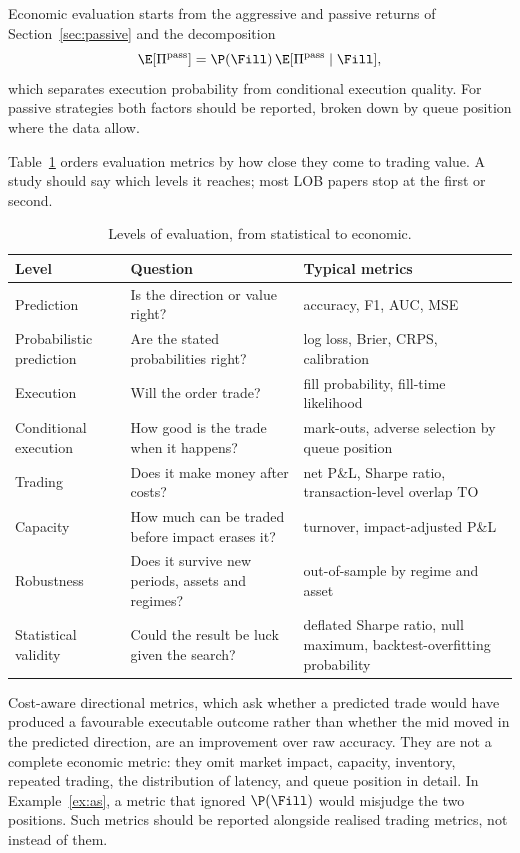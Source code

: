 Economic evaluation starts from the aggressive and passive returns of Section~\ref{sec:passive} and
the decomposition 
\[
  \E[\Pi^{\text{pass}}] = \P(\Fill)\,\E[\Pi^{\text{pass}} \mid \Fill],
\]
which separates execution probability
from conditional execution quality. For passive strategies both factors should be reported, broken
down by queue position where the data allow.

Table~\ref{tab:metric-levels} orders evaluation metrics by how close they come to trading value. A
study should say which levels it reaches; most LOB papers stop at the first or second.

\begin{table}[!htbp]
\centering\footnotesize
\caption{Levels of evaluation, from statistical to economic.}
\label{tab:metric-levels}
\begin{tabularx}{\linewidth}{l>{\raggedright\arraybackslash}X>{\raggedright\arraybackslash}X}
\toprule
Level & Question & Typical metrics \\
\midrule
Prediction & Is the direction or value right? & accuracy, F1, AUC, MSE \\
Probabilistic prediction & Are the stated probabilities right? & log loss, Brier, CRPS, calibration \\
Execution & Will the order trade? & fill probability, fill-time likelihood \\
Conditional execution & How good is the trade when it happens? & mark-outs, adverse selection by queue position \\
Trading & Does it make money after costs? & net P\&L, Sharpe ratio, transaction-level overlap $\mathrm{TO}$~\citep{briola2024} \\
Capacity & How much can be traded before impact erases it? & turnover, impact-adjusted P\&L \\
Robustness & Does it survive new periods, assets and regimes? & out-of-sample by regime and asset \\
Statistical validity & Could the result be luck given the search? & deflated Sharpe ratio, null maximum, backtest-overfitting probability \\
\bottomrule
\end{tabularx}
\end{table}

Cost-aware directional metrics, which ask whether a predicted trade would have produced a favourable
executable outcome rather than whether the mid moved in the predicted direction, are an improvement
over raw accuracy. They are not a complete economic metric: they omit market impact, capacity,
inventory, repeated trading, the distribution of latency, and queue position in detail. In
Example~\ref{ex:as}, a metric that ignored $\P(\Fill)$ would misjudge the two positions. Such
metrics should be reported alongside realised trading metrics, not instead of them.

